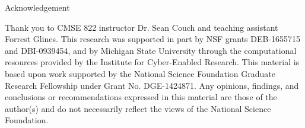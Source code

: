 \begin{block}{Acknowledgement}
{\footnotesize
Thank you to CMSE 822 instructor Dr. Sean Couch and teaching assistant Forrest Glines.
This research was supported in part by NSF grants DEB-1655715 and DBI-0939454, and by Michigan State University through the computational resources provided by the Institute for Cyber-Enabled Research.
This material is based upon work supported by the National Science Foundation Graduate Research Fellowship under Grant No. DGE-1424871.
Any opinions, findings, and conclusions or recommendations expressed in this
material are those of the author(s) and do not necessarily reflect the views of the National Science Foundation.\par
}
\end{block}
